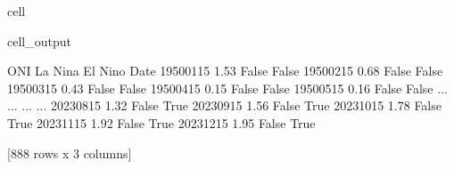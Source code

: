 \documentclass[letterpaper,10pt,english]{jupyterBook}
\begin{document}
\begin{sphinxuseclass}{cell}
\begin{sphinxVerbatimOutput}
\begin{sphinxuseclass}{cell_output}
\begin{sphinxVerbatim}[commandchars=\\\{\}]
             ONI  La Nina  El Nino
Date                              
1950\PYGZhy{}01\PYGZhy{}15 \PYGZhy{}1.53    False    False
1950\PYGZhy{}02\PYGZhy{}15 \PYGZhy{}0.68    False    False
1950\PYGZhy{}03\PYGZhy{}15 \PYGZhy{}0.43    False    False
1950\PYGZhy{}04\PYGZhy{}15 \PYGZhy{}0.15    False    False
1950\PYGZhy{}05\PYGZhy{}15  0.16    False    False
...          ...      ...      ...
2023\PYGZhy{}08\PYGZhy{}15  1.32    False     True
2023\PYGZhy{}09\PYGZhy{}15  1.56    False     True
2023\PYGZhy{}10\PYGZhy{}15  1.78    False     True
2023\PYGZhy{}11\PYGZhy{}15  1.92    False     True
2023\PYGZhy{}12\PYGZhy{}15  1.95    False     True

[888 rows x 3 columns]
\end{sphinxVerbatim}

\end{sphinxuseclass}\end{sphinxVerbatimOutput}

\end{sphinxuseclass}
\end{document}
